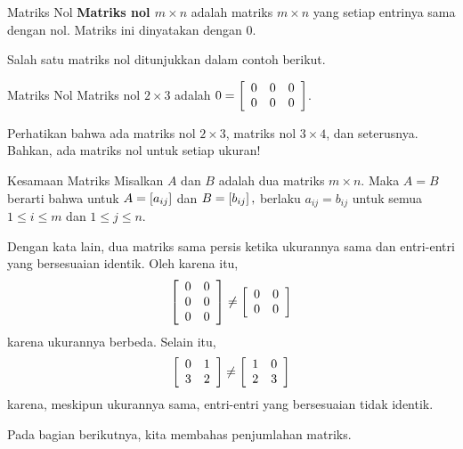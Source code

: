 \begin{definition}{Matriks Nol}\label{def:zeromatrix}
\textbf{Matriks nol $m\times n$} adalah matriks $m\times n$
yang setiap entrinya sama dengan nol. Matriks ini
 dinyatakan dengan $0.$
\end{definition}

Salah satu matriks nol ditunjukkan dalam contoh berikut.

\begin{example}{Matriks Nol}\label{exa:zeromatrix}
Matriks nol $2\times 3$ adalah $0= \left[
\begin{array}{ccc}
0 & 0 & 0 \\
0 & 0 & 0
\end{array}
\right] $.
\end{example}

Perhatikan bahwa ada matriks nol $2\times 3$, matriks nol $3\times 4$, dan seterusnya. Bahkan,
ada matriks nol untuk setiap ukuran! 

\begin{definition}{Kesamaan Matriks}\label{def:equalityofmatrices}
 Misalkan $A$ dan $B$ adalah dua matriks $m \times n$. Maka $A=B$  berarti
bahwa untuk $A=\left[ a_{ij}\right] $
dan $B=\left[ b_{ij}\right] ,$ berlaku $a_{ij}=b_{ij}$ untuk semua $1\leq i\leq m$ dan
$1\leq j\leq n.$
\end{definition}

Dengan kata lain, dua matriks sama persis ketika ukurannya sama dan
entri-entri yang bersesuaian identik. Oleh karena itu,
\begin{equation*}
\left[
\begin{array}{rr}
0 & 0 \\
0 & 0 \\
0 & 0
\end{array}
\right] \neq \left[
\begin{array}{rr}
0 & 0 \\
0 & 0
\end{array}
\right]
\end{equation*}
karena ukurannya berbeda. 
Selain itu,
\begin{equation*}
\left[
\begin{array}{rr}
0 & 1 \\
3 & 2 
\end{array}
\right] \neq \left[
\begin{array}{rr}
1 & 0 \\
2 & 3
\end{array}
\right]
\end{equation*}
karena, meskipun ukurannya sama, entri-entri yang bersesuaian tidak identik.

Pada bagian berikutnya, kita membahas penjumlahan matriks. 
